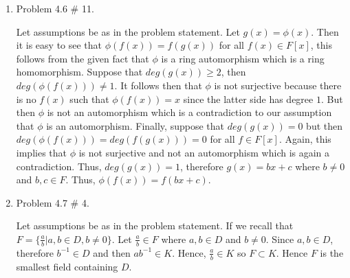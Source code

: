 \documentclass[11pt]{article}
\begin{document}
\begin{enumerate}
Let assumptions be as in the problem statement. In order to prove that $\phi$ is an automorphism we need to show that $\phi$ preserves both addition and multiplication, is onto, is one to one, and the codomain is the same as the domain. The codomain is the same as the domain by the definition of $\phi$ from the problem statement. Then suppose we have $f(x)=a_0+a_1(x)+...+a_n(x)^n,g(x)=b_0+b_1(x)+...+b_n(x)^n\in F[x]$, then we have that $\phi(f(x)) = a_0+a_1(bx+c)+...+a_n(bx+c)^n, \phi(g(x)) = b_0+b_1(bx+c)+...+b_n(bx+c)^n$, then $\phi(f(x))+\phi(g(x)) = a_0+a_1(bx+c)+...+a_n(bx+c)^n+b_0+b_1(bx+c)+...+b_n(bx+c)^n=(a_0+b_0)+(a_1+b_1)(bx+c)+...+(a_n+b_n)(bx+c)^n = \phi(f(x)+g(x))$. Similarly, $\phi(f(x)g(x)) = \phi((fg)(x)) = (fg)(bx+c) = f(bx+c)g(bx+c) = \phi(f(x))\phi(g(x))$. Therefore, $\phi$ preserves addition and multiplication in the field which makes it a homomorphism. Now we will show that $\phi$ is one to one. Let us say $\phi(f(x)) = \phi(g(x))$ then identically to the process used in problem one of this homework assignment, $f(x)=g(x)$. Therefore, we know that $\phi$ is one to one. Again similarly to the process used in number one of this homework assignment, $\phi$ is onto. Therefore, since $\phi$ preserves addition and multiplication, is one to one, is onto, and the codomain is equal to the domain then $\phi$ is an automorphism. It is also simple to see that if $f(x) = a$ then $\phi(f(x)) = a$ which implies that $\phi(a)=a.$

\pagebreak
\item Problem 4.6 \# 11.

Let assumptions be as in the problem statement. Let $g(x)=\phi(x)$. Then it is easy to see that $\phi(f(x)) = f(g(x))$ for all $f(x)\in F[x]$, this follows from the given fact that $\phi$ is a ring automorphism which is a ring homomorphism. Suppose that $deg(g(x)) \geq 2$, then $deg(\phi(f(x))) \neq 1$. It follows then that $\phi$ is not surjective because there is no $f(x)$ such that $\phi(f(x))=x$ since the latter side has degree $1$. But then $\phi$ is not an automorphism which is a contradiction to our assumption that $\phi$ is an automorphism. Finally, suppose that $deg(g(x))=0$ but then $deg(\phi(f(x)))=deg(f(g(x))) = 0$ for all $f\in F[x].$ Again, this implies that $\phi$ is not surjective and not an automorphism which is again a contradiction. Thus, $deg(g(x))=1$, therefore $g(x)=bx+c$ where $b\neq 0$ and $b,c\in F$. Thus, $\phi(f(x))=f(bx+c)$.

\pagebreak
\item Problem 4.7 \# 4.

Let assumptions be as in the problem statement. If we recall that $F=\{\frac{a}{b}|a,b\in D, b\neq 0\}$. Let $\frac{a}{b}\in F$ where $a,b\in D$ and $b\neq 0$. Since $a,b\in D$, therefore $b^{-1}\in D$ and then $ab^{-1}\in K$. Hence, $\frac{a}{b}\in K$ so $F\subset K$. Hence $F$ is the smallest field containing $D$.

\end{enumerate}
\end{document}
